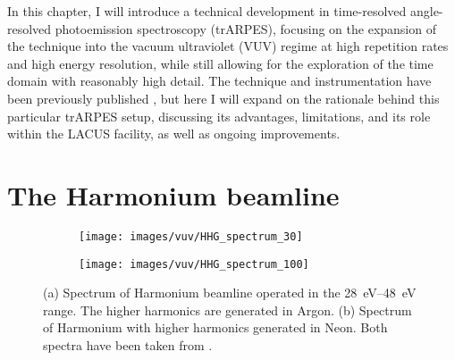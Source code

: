 In this chapter, I will introduce a technical development in time-resolved angle-resolved photoemission spectroscopy (trARPES), focusing on the expansion of the technique into the vacuum ultraviolet (VUV) regime at high repetition rates and high energy resolution, while still allowing for the exploration of the time domain with reasonably high detail.
The technique and instrumentation have been previously published \cite{hellbruck_high-resolution_2024}, but here I will expand on the rationale behind this particular trARPES setup, discussing its advantages, limitations, and its role within the LACUS facility, as well as ongoing improvements.

\section{The Harmonium beamline}

\begin{figure}
	\centering
	\begin{subfigure}[b]{0.45\textwidth}
		\texttt{[image: images/vuv/HHG\_spectrum\_30]}
		\caption{}
	\end{subfigure}
	\begin{subfigure}[b]{0.45\textwidth}
		\texttt{[image: images/vuv/HHG\_spectrum\_100]}
		\caption{}
	\end{subfigure}
	\caption{(a) Spectrum of Harmonium beamline operated in the \qtyrange{28}{48}{\electronvolt} range. The higher harmonics are generated in Argon. (b) Spectrum of Harmonium with higher harmonics generated in Neon. Both spectra have been taken from \cite{ojeda_harmonium_2015}.}
	\label{fig:hhgspectrum}
\end{figure}


